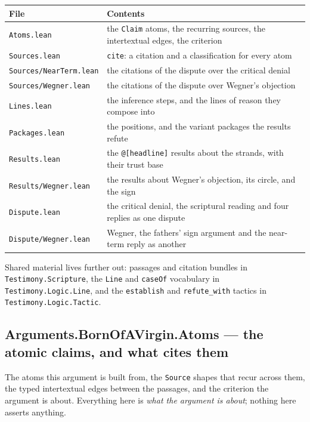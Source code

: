 \documentclass[11pt]{article}
\begin{document}
\begin{longtable}{@{}>{\raggedright\arraybackslash}p{} >{\raggedright\arraybackslash}p{}@{}}
\toprule
\textbf{File} & \textbf{Contents} \\
\midrule
\endhead
\texttt{Atoms.lean} & the \texttt{Claim} atoms, the recurring sources, the intertextual edges, the criterion \\
\texttt{Sources.lean} & \texttt{cite}: a citation and a classification for every atom \\
\texttt{Sources/Near\allowbreak{}Term.lean} & the citations of the dispute over the critical denial \\
\texttt{Sources/Wegner.lean} & the citations of the dispute over Wegner's objection \\
\texttt{Lines.lean} & the inference steps, and the lines of reason they compose into \\
\texttt{Packages.lean} & the positions, and the variant packages the results refute \\
\texttt{Results.lean} & the \texttt{@[headline]} results about the strands, with their trust base \\
\texttt{Results/Wegner.lean} & the results about Wegner's objection, its circle, and the sign \\
\texttt{Dispute.lean} & the critical denial, the scriptural reading and four replies as one dispute \\
\texttt{Dispute/Wegner.lean} & Wegner, the fathers' sign argument and the near-term reply as another \\
\bottomrule
\end{longtable}
Shared material lives further out: passages and citation bundles in \texttt{Testimony.Scripture}, the \texttt{Line} and \texttt{case\allowbreak{}Of} vocabulary in \texttt{Testimony.Logic.Line}, and the \texttt{establish} and \texttt{refute\_\allowbreak{}with} tactics in \texttt{Testimony.Logic.Tactic}.

\subsection*{Arguments.BornOfAVirgin.Atoms — the atomic claims, and what cites them}
The atoms this argument is built from, the \texttt{Source} shapes that recur across them, the typed intertextual edges between the passages, and the criterion the argument is about. Everything here is \emph{what the argument is about}; nothing here asserts anything.
\end{document}
